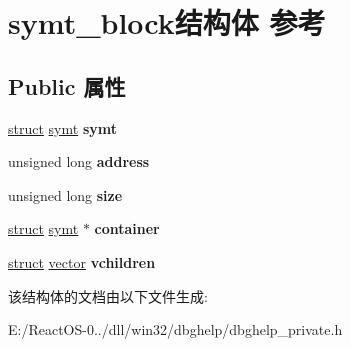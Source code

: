 \hypertarget{structsymt__block}{}\section{symt\+\_\+block结构体 参考}
\label{structsymt__block}
\subsection*{Public 属性}
\begin{DoxyCompactItemize}
\item 
\mbox{\label{structsymt__block_a53f5dbf4e4c5da939179fb302f36ce45}} 
\hyperlink{interfacestruct}{struct} \hyperlink{structsymt}{symt} {\bfseries symt}
\item 
\mbox{\label{structsymt__block_a05a661029bef9600ea28f5ee27ef349c}} 
unsigned long {\bfseries address}
\item 
\mbox{\label{structsymt__block_aba66a85b0924a772ac13d565991544d8}} 
unsigned long {\bfseries size}
\item 
\mbox{\label{structsymt__block_adbf3debdeed42b1c7357c6462ffb93cf}} 
\hyperlink{interfacestruct}{struct} \hyperlink{structsymt}{symt} $\ast$ {\bfseries container}
\item 
\mbox{\label{structsymt__block_a067357531d0cf8ff321fd1cb1aaa4192}} 
\hyperlink{interfacestruct}{struct} \hyperlink{structvector}{vector} {\bfseries vchildren}
\end{DoxyCompactItemize}


该结构体的文档由以下文件生成\+:\begin{DoxyCompactItemize}
\item 
E\+:/\+React\+O\+S-\/0../dll/win32/dbghelp/dbghelp\+\_\+private.\+h\end{DoxyCompactItemize}
